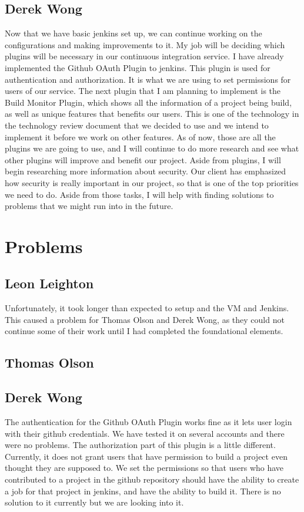 \documentclass[10pt,onecolumn,journal,draftclsnofoot]{IEEEtran}
\begin{document}
\subsection{Derek Wong}
Now that we have basic jenkins set up, we can continue working on the configurations and making improvements to it. My job will be deciding which plugins will be necessary in our continuous integration service. I have already implemented the Github OAuth Plugin to jenkins. This plugin is used for authentication and authorization. It is what we are using to set permissions for users of our service. The next plugin that I am planning to implement is the Build Monitor Plugin, which shows all the information of a project being build, as well as unique features that benefits our users. This is one of the technology in the technology review document that we decided to use and we intend to implement it before we work on other features. As of now, those are all the plugins we are going to use, and I will continue to do more research and see what other plugins will improve and benefit our project. Aside from plugins, I will begin researching more information about security. Our client has emphasized how security is really important in our project, so that is one of the top priorities we need to do. Aside from those tasks, I will help with finding solutions to problems that we might run into in the future.


\section{Problems}
\subsection{Leon Leighton}
Unfortunately, it took longer than expected to setup and the VM and Jenkins.
This caused a problem for Thomas Olson and Derek Wong, as they could not continue some of their work until I had completed the foundational elements.

\subsection{Thomas Olson}

\subsection{Derek Wong}
The authentication for the Github OAuth Plugin works fine as it lets user login with their github credentials. We have tested it on several accounts and there were no problems. The authorization part of this plugin is a little different. Currently, it does not grant users that have permission to build a project even thought they are supposed to. We set the permissions so that users who have contributed to a project in the github repository should have the ability to create a job for that project in jenkins, and have the ability to build it. There is no solution to it currently but we are looking into it.
\end{document}
